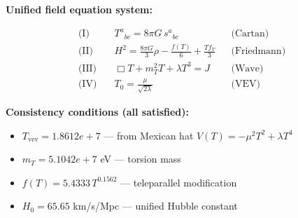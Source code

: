 
\textbf{Unified field equation system:}

\begin{align}
  \text{(I)} \quad & T^a{}_{bc} = 8\pi G \, s^a{}_{bc} && \text{(Cartan)} \\
  \text{(II)} \quad & H^2 = \frac{8\pi G}{3}\rho - \frac{f(T)}{6} + \frac{Tf_T}{3} && \text{(Friedmann)} \\
  \text{(III)} \quad & \Box T + m_T^2 T + \lambda T^3 = J && \text{(Wave)} \\
  \text{(IV)} \quad & T_0 = \frac{\mu}{\sqrt{2\lambda}} && \text{(VEV)}
\end{align}

\textbf{Consistency conditions (all satisfied):}
\begin{itemize}
  \item $T_{\text{vev}} = 1.8612e+7$ — from Mexican hat $V(T) = -\mu^2 T^2 + \lambda T^4$
  \item $m_T = 5.1042e+7$ eV — torsion mass
  \item $f(T) = 5.4333 \, T^{0.1562}$ — teleparallel modification
  \item $H_0 = 65.65$ km/s/Mpc — unified Hubble constant
\end{itemize}